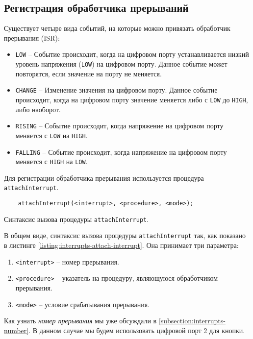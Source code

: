 \documentclass[../sparc.tex]{subfiles}
\begin{document}
\subsection{Регистрация обработчика прерываний}

Существует четыре вида событий, на которые можно привязать обработчик прерывания
(\gls{ISR}):
\begin{itemize}
\item \texttt{LOW} -- Событие происходит, когда на цифровом порту устанавливается
  низкий уровень напряжения (\texttt{LOW}) на цифровом порту.  Данное событие
  может повторятся, если значение на порту не меняется.
\item \texttt{CHANGE} -- Изменение значения на цифровом порту.  Данное событие
  происходит, когда на цифровом порту значение меняется либо с \texttt{LOW} до
  \texttt{HIGH}, либо наоборот.
\item \texttt{RISING} -- Событие происходит, когда напряжение на цифровом порту
  меняется с \texttt{LOW} на \texttt{HIGH}.
\item \texttt{FALLING} -- Событие происходит, когда напряжение на цифровом порту
  меняется с \texttt{HIGH} на \texttt{LOW}.
\end{itemize}

Для регистрации обработчика прерывания используется процедура
\texttt{attachInterrupt}.

\begin{listing}[H]
  \begin{verbatim}
    attachInterrupt(<interrupt>, <procedure>, <mode>);
  \end{verbatim}
  \caption{Синтаксис вызова процедуры \texttt{attachInterrupt}.}
  \label{listing:interrupts-attach-interrupt}
\end{listing}

В общем виде, синтаксис вызова процедуры \texttt{attachInterrupt} так, как
показано в листинге \ref{listing:interrupts-attach-interrupt}.  Она принимает
три параметра:
\begin{enumerate}
\item \texttt{<interrupt>} -- номер прерывания.
\item \texttt{<procedure>} -- указатель на процедуру, являющуюся обработчиком
  прерывания.
\item \texttt{<mode>} -- условие срабатывания прерывания.
\end{enumerate}

Как узнать \emph{номер прерывания} мы уже обсуждали в
\ref{subsection:interrupts-number}.  В данном случае мы будем использовать
цифровой порт 2 для кнопки.
\end{document}
